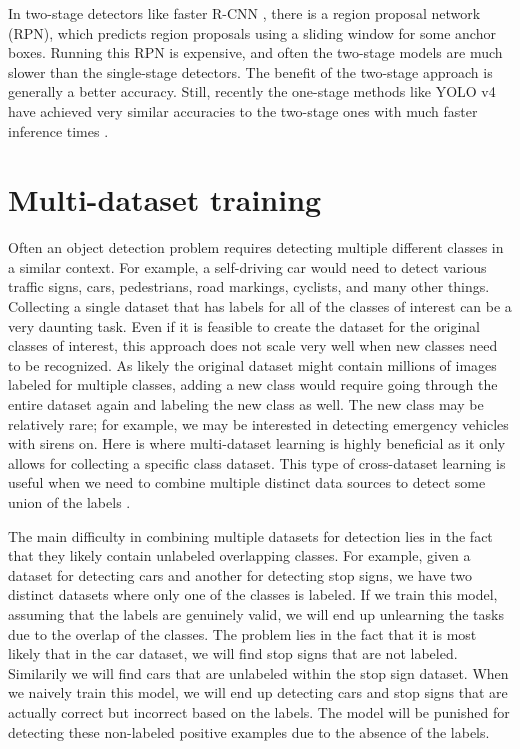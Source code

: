 In two-stage detectors like faster R-CNN \citep{faster-rcnn}, there is a region proposal network (RPN), which predicts region proposals using a sliding window for some anchor boxes.
Running this RPN is expensive, and often the two-stage models are much slower than the single-stage detectors.
The benefit of the two-stage approach is generally a better accuracy. 
Still, recently the one-stage methods like YOLO v4 have achieved very similar accuracies to the two-stage ones with much faster inference times \citep{yolov4}.

\section{Multi-dataset training}
Often an object detection problem requires detecting multiple different classes in a similar context.
For example, a self-driving car would need to detect various traffic signs, cars, pedestrians, road markings, cyclists, and many other things.
Collecting a single dataset that has labels for all of the classes of interest can be a very daunting task.
Even if it is feasible to create the dataset for the original classes of interest, this approach does not scale very well when new classes need to be recognized.
As likely the original dataset might contain millions of images labeled for multiple classes, adding a new class would require going through the entire dataset again and labeling the new class as well.
The new class may be relatively rare; for example, we may be interested in detecting emergency vehicles with sirens on.
Here is where multi-dataset learning is highly beneficial as it only allows for collecting a specific class dataset.
This type of cross-dataset learning is useful when we need to combine multiple distinct data sources to detect some union of the labels \citep{cross_data}.

The main difficulty in combining multiple datasets for detection lies in the fact that they likely contain unlabeled overlapping classes.
For example, given a dataset for detecting cars and another for detecting stop signs, we have two distinct datasets where only one of the classes is labeled.
If we train this model, assuming that the labels are genuinely valid, we will end up unlearning the tasks due to the overlap of the classes.
The problem lies in the fact that it is most likely that in the car dataset, we will find stop signs that are not labeled.
Similarily we will find cars that are unlabeled within the stop sign dataset.
When we naively train this model, we will end up detecting cars and stop signs that are actually correct but incorrect based on the labels.
The model will be punished for detecting these non-labeled positive examples due to the absence of the labels.

